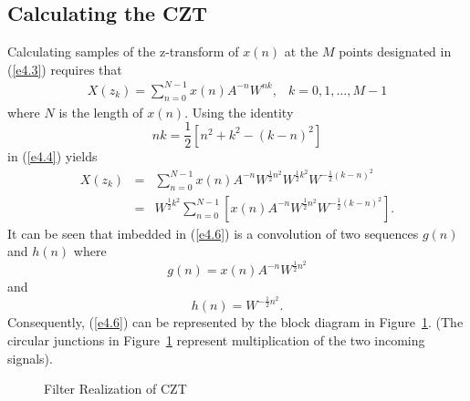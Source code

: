 \subsection{Calculating the CZT}

	Calculating samples of the z-transform
of $x(n)$ at the $M$ points designated in (\ref{e4.3})
requires that
%
\begin{equation}
\begin{array}{cc}
{\displaystyle X(z_k)=\sum_{n=0}^{N-1}x(n)A^{-n}W^{nk}}, & k=0,1,\ldots,M-1
\end{array}
\label{e4.4}
\end{equation}
%
where $N$ is the length of $x(n)$.  Using the identity
%
\begin{equation}
nk=\frac{1}{2}[n^2+k^2-(k-n)^2]
\label{e4.5}
\end{equation}
%
in (\ref{e4.4}) yields
%
\begin{eqnarray}
X(z_k)&=&\sum_{n=0}^{N-1}x(n)A^{-n}W^{\frac{1}{2}n^2}W^{\frac{1}{2}k^2}
W^{-\frac{1}{2}(k-n)^2}\nonumber\\
      &=& W^{\frac{1}{2}k^2}\sum_{n=0}^{N-1}[x(n)A^{-n}W^{\frac{1}{2}n^2}
W^{-\frac{1}{2}(k-n)^2}].
\label{e4.6}
\end{eqnarray}
%
It can be seen that imbedded in (\ref{e4.6}) is a convolution of two
sequences $g(n)$ and $h(n)$ where
%
\begin{equation}
g(n)=x(n)A^{-n}W^{\frac{1}{2}n^2}
\label{e4.7}
\end{equation}
%
and
%
\begin{equation}
h(n)=W^{-\frac{1}{2}n^2}.
\label{e4.8}
\end{equation}
%
Consequently, (\ref{e4.6}) can be represented by the block
diagram in Figure~\ref{f4.2}.  (The circular junctions in
Figure~\ref{f4.2} represent multiplication of the two incoming
signals).
%
\begin{figure}[tb]
\caption{Filter Realization of CZT}
\label{f4.2}
\end{figure}
%

